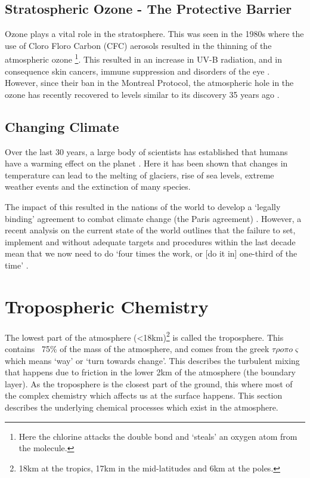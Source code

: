 %
\subsection{Stratospheric Ozone - The Protective Barrier}\label{sec:ozonerole}
Ozone plays a vital role in the stratosphere. This was seen in the 1980s where the use of Cloro Floro Carbon (CFC) aerosols resulted in the thinning of the atmospheric ozone \citep{ozonehole}\footnote{Here the chlorine attacks the double bond and `steals' an oxygen atom from the  molecule.}. This resulted in an increase in UV-B radiation, and in consequence skin cancers, immune suppression and disorders of the eye \citep{o3damage}. However, since their ban in the Montreal Protocol, the atmospheric hole in the ozone has recently recovered to levels similar to its discovery 35 years ago \citep{ozonerepair}.


\subsection{Changing Climate} \label{sec:climatechange}
Over the last 30 years, a large body of scientists has established that humans have a warming effect on the planet \citep{IPCC1990Science,IPCC1995Science,IPCC2007Science,IPCC2013Science,ipbes}. Here it has been shown that changes in temperature can lead to the melting of glaciers, rise of sea levels, extreme weather events and the extinction of many species.

The impact of this resulted in the nations of the world to develop a `legally binding' agreement to combat climate change (the Paris agreement) \citep{paris1,paris}. However, a recent analysis on the current state of the world outlines that the failure to set, implement and without adequate targets and procedures within the last decade mean that we now need to do `four times the work, or [do it in] one-third of the time' \citep{failparis}.



\section{Tropospheric Chemistry}

The lowest part of the atmosphere (<18km)\footnote{18km at the tropics, 17km in the mid-latitudes and 6km at the poles. } is called the troposphere. This contains ~75\% of the mass of the atmosphere, and comes from the greek $\tau\rho o \pi o \varsigma$ which means `way' or `turn towards change'. This describes the turbulent mixing that happens due to friction in the lower 2km of the atmosphere (the boundary layer). As the troposphere is the closest part of the ground, this where most of the complex chemistry which affects us at the surface happens. This section describes the underlying chemical processes which exist in the atmosphere.




